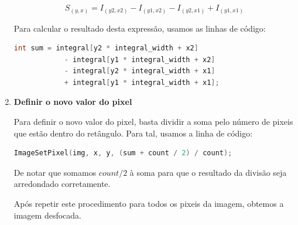 \begin{enumerate}
{\begin{equation}
    S_{(y,x)} = I_{(y2,x2)} - I_{(y1,x2)} - I_{(y2,x1)} + I_{(y1,x1)}
\end{equation}\label{eq:equacao-para-soma}

Para calcular o resultado desta expressão, usamos as linhas de código:

\begin{lstlisting}[language=C]
    int sum = integral[y2 * integral_width + x2]
            - integral[y1 * integral_width + x2]
            - integral[y2 * integral_width + x1]
            + integral[y1 * integral_width + x1];
\end{lstlisting}
}

\item {
\textbf{Definir o novo valor do pixel}

Para definir o novo valor do pixel, basta dividir a soma pelo número de pixeis que estão dentro do retângulo. Para tal, usamos a linha de código:

\begin{lstlisting}[language=C]
    ImageSetPixel(img, x, y, (sum + count / 2) / count);
\end{lstlisting}

De notar que somamos $count/2$ à soma para que o resultado da divisão seja arredondado corretamente.
}

Após repetir este procedimento para todos os pixeis da imagem, obtemos a imagem desfocada.
\end{enumerate}

